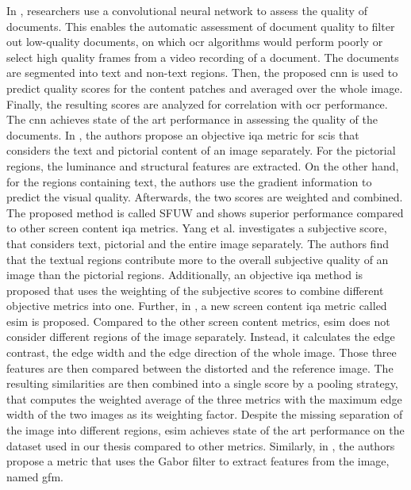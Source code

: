 In \cite{ocr_cnn_docu_2014}, researchers use a convolutional neural network to assess the quality of documents.
This enables the automatic assessment of document quality to filter out low-quality documents, on which \gls{ocr} algorithms would perform poorly or select high quality frames from a video recording of a document.
The documents are segmented into text and non-text regions.
Then, the proposed \gls{cnn} is used to predict quality scores for the content patches and averaged over the whole image.
Finally, the resulting scores are analyzed for correlation with \gls{ocr} performance.
The \gls{cnn} achieves state of the art performance in assessing the quality of the documents.
In \cite{text_pict_weight_2017}, the authors propose an objective \gls{iqa} metric for \glspl{sci} that considers the text and pictorial content of an image separately.
For the pictorial regions, the luminance and structural features are extracted.
On the other hand, for the regions containing text, the authors use the gradient information to predict the visual quality.
Afterwards, the two scores are weighted and combined.
The proposed method is called SFUW and shows superior performance compared to other screen content \gls{iqa} metrics.
Yang et al. \cite{3_subj_weight_2015} investigates a subjective score, that considers text, pictorial and the entire image separately.
The authors find that the textual regions contribute more to the overall subjective quality of an image than the pictorial regions.
Additionally, an objective \gls{iqa} method is proposed that uses the weighting of the subjective scores to combine different objective metrics into one.
Further, in \cite{ni_esim_2017}, a new screen content \gls{iqa} metric called \gls{esim} is proposed.
Compared to the other screen content metrics, \gls{esim} does not consider different regions of the image separately.
Instead, it calculates the edge contrast, the edge width and the edge direction of the whole image.
Those three features are then compared between the distorted and the reference image.
The resulting similarities are then combined into a single score by a pooling strategy, that computes the weighted average of the three metrics with the maximum edge width of the two images as its weighting factor.
Despite the missing separation of the image into different regions, \gls{esim} achieves state of the art performance on the dataset used in our thesis compared to other metrics.
Similarly, in \cite{iqa_sci_gabor_2018}, the authors propose a metric that uses the Gabor filter to extract features from the image, named \gls{gfm}.
